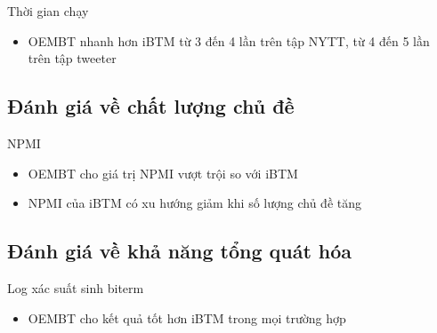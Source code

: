 \documentclass[pdf]{beamer}
\begin{document}
\begin{frame}{Thời gian chạy}
	\begin{figure}
	\end{figure}
	
	\begin{itemize}
		\item OEMBT nhanh hơn iBTM từ 3 đến 4 lần trên tập NYTT, từ 4 đến 5 lần trên tập tweeter
	\end{itemize}	
\end{frame}

\subsection{Đánh giá về chất lượng chủ đề}
\begin{frame}{NPMI}
	\begin{figure}
	\end{figure}
	
	\begin{itemize}
		\item OEMBT cho giá trị NPMI vượt trội so với iBTM
		\item NPMI của iBTM có xu hướng giảm khi số lượng chủ đề tăng
	\end{itemize}	
\end{frame}

\subsection{Đánh giá về khả năng tổng quát hóa}
\begin{frame}{Log xác suất sinh biterm}
	\begin{figure}
	\end{figure}
	
	\begin{itemize}
		\item OEMBT cho kết quả tốt hơn iBTM trong mọi trường hợp
	\end{itemize}	
\end{frame}
\end{document}
